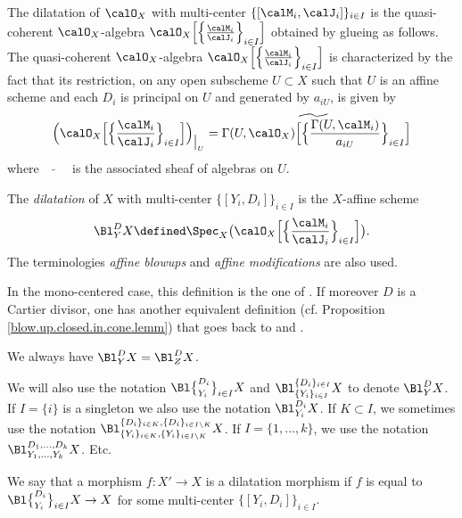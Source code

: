 \documentclass[10pt]{alggeom}
\theoremstyle{definition}
\numberwithin{equation}{section}
\begin{document}
\depr \label{defiqcoalg} \begin{sloppypar}
The dilatation of $\calO_X$ with multi-center $\{[\calM _i , \calJ _i ] \}_{i \in I}$ is the quasi-coherent $\calO _X$-algebra  $\calO _X \Big[\Big\{ \frac{\calM_i}{\calJ_i}\Big\}_{i \in I} \Big]$ obtained by glueing as follows.  The quasi-coherent $\calO _X$-algebra $\calO _X \Big[\Big\{ \frac{\calM_i}{\calJ_i}\Big\}_{i \in I} \Big]$ is characterized by the fact that its restriction, on any open subscheme $ U \subset X$ such that $U$ is an affine scheme and each $D_i$ is principal on $U$ and generated by $a_{iU}$, is given by
\[ \Big( \calO _X \Big[\Big\{ \frac{\calM_i}{\calJ_i}\Big\}_{i \in I} \Big] \Big) _{\big|_{U_{}}}  =\widetilde{ \Gamma (U , \calO _X ) \Big[\Big\{ \frac{\Gamma (U, \calM _i) }{a_{i U} }\Big\}_{i \in I}} \Big] \]
where $\widetilde{~~~~~~~~~}$ is the associated sheaf of algebras on $U$. \end{sloppypar}
\xdepr




 \label{defimultidilaalgsp}
The \textit{dilatation} of $X$  with multi-center $\{[Y_i , D_i ]\} _{i \in I} $ is the $X$-affine scheme 
\[
\Bl_Y^DX\defined \Spec _X \big( \calO _X \Big[\Big\{ \frac{\calM_i}{\calJ_i}\Big\}_{i \in I} \Big] \big).
\]
The terminologies \textit{affine blowups} and \textit{affine modifications} are also used. \xdefi

\rema
In the mono-centered case, this definition is the one of \cite{MRR20}. If moreover $D$ is a Cartier divisor, one has another equivalent definition (cf. Proposition \ref{blow.up.closed.in.cone.lemm}) that goes back to \cite{KZ99} and \cite{Du05}.
\xrema 

\rema \label{remaYZYZYZ}
We always have $\Bl _Y ^D X = \Bl _Z ^D X$.
\xrema 


\nota \label{notabl}We will also use the notation  $ \Bl \big\{ _{Y_i}^{D_i } \big\}_{i\in I} X$ and $\Bl _{ \{Y_i\}_{i\in I}}^{\{D_i\}_{i\in I}} X $ to denote $\Bl _Y ^D X $. If $I= \{i\}$ is a singleton  we also use the notation $\Bl _{Y_i} ^{D_i} X $. If $K \subset I$, we sometimes use the notation $\Bl _{ \{Y_i\}_{i\in K}, \{Y_i\}_{i\in I \setminus K}}^{\{D_i\}_{i\in K},\{D_i\}_{i\in I \setminus K} } X $. If $I = \{1 , \ldots ,k\}$, we use the notation $\Bl _{Y_1, \ldots , Y_k}^{D_1 , \ldots , D_k} X$. Etc. \xnota 

 \label{dilamapdee}We say that a morphism $f:X' \to X$ is a dilatation morphism if $f  $ is equal to $ \Bl \big\{ _{Y_i}^{D_i } \big\}_{i\in I} X \to X$ for some multi-center $\{[Y_i , D_i]\}_{i \in I}.$\xdefi
\end{document}
